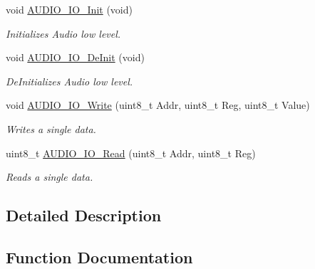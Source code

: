 \begin{DoxyCompactItemize}
void \mbox{\hyperlink{group___s_t_m32_f4___d_i_s_c_o_v_e_r_y___l_o_w___l_e_v_e_l___private___functions_gace44c34a627a0fb28c61366b9ca80b78}{A\+U\+D\+I\+O\+\_\+\+I\+O\+\_\+\+Init}} (void)
\begin{DoxyCompactList}\small\item\em Initializes Audio low level. \end{DoxyCompactList}\item 
\mbox{\label{group___s_t_m32_f4___d_i_s_c_o_v_e_r_y___l_o_w___l_e_v_e_l___private___functions_ga06ed3f7f32df17d8b5099754dd81d6b3}} 
void \mbox{\hyperlink{group___s_t_m32_f4___d_i_s_c_o_v_e_r_y___l_o_w___l_e_v_e_l___private___functions_ga06ed3f7f32df17d8b5099754dd81d6b3}{A\+U\+D\+I\+O\+\_\+\+I\+O\+\_\+\+De\+Init}} (void)
\begin{DoxyCompactList}\small\item\em De\+Initializes Audio low level. \end{DoxyCompactList}\item 
void \mbox{\hyperlink{group___s_t_m32_f4___d_i_s_c_o_v_e_r_y___l_o_w___l_e_v_e_l___private___functions_ga269d6aa92989351e75f6d58378e3b9ba}{A\+U\+D\+I\+O\+\_\+\+I\+O\+\_\+\+Write}} (uint8\+\_\+t Addr, uint8\+\_\+t Reg, uint8\+\_\+t Value)
\begin{DoxyCompactList}\small\item\em Writes a single data. \end{DoxyCompactList}\item 
uint8\+\_\+t \mbox{\hyperlink{group___s_t_m32_f4___d_i_s_c_o_v_e_r_y___l_o_w___l_e_v_e_l___private___functions_gaf8740cdd8dfc7929d23d52d6fcf0901f}{A\+U\+D\+I\+O\+\_\+\+I\+O\+\_\+\+Read}} (uint8\+\_\+t Addr, uint8\+\_\+t Reg)
\begin{DoxyCompactList}\small\item\em Reads a single data. \end{DoxyCompactList}\end{DoxyCompactItemize}


\subsection{Detailed Description}


\subsection{Function Documentation}
\mbox{\label{group___s_t_m32_f4___d_i_s_c_o_v_e_r_y___l_o_w___l_e_v_e_l___private___functions_gaf8740cdd8dfc7929d23d52d6fcf0901f}} 
